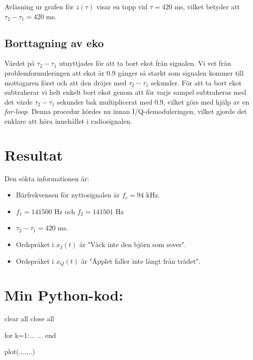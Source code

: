 \documentclass[10pt,twocolumn]{article}
\begin{document}
Avläsning ur grafen för $z(\tau)$ visar en topp vid $\tau = 420$ ms, vilket
betyder att $\tau_2 - \tau_1 = 420$ ms.

\subsection{Borttagning av eko}
Värdet på $\tau_2 - \tau_1$ utnyttjades för att ta bort ekot från signalen. Vi
vet från problemformuleringen att ekot är 0.9 gånger så starkt som signalen kommer
till mottagaren först och att den dröjer med $\tau_2 - \tau_1$ sekunder. För
att ta bort ekot subtraherar vi helt enkelt bort ekot genom att för varje
sampel subtraheras med det värde $\tau_2 - \tau_1$ sekunder bak multiplicerat
med 0.9, vilket görs med hjälp av en \textit{for-loop}. Denna procedur kördes
nu innan I/Q-demoduleringen, vilket gjorde det enklare att höra
innehållet i radiosignalen.

% 

\section{Resultat}

Den sökta informationen är:
\begin{itemize}
\item Bärfrekvensen för nyttosignalen är $f_c=94$ kHz.
\item $f_1=141500$ Hz och $f_2=141501$ Hz
\item $\tau_2 - \tau_1 = 420$ ms.
\item Ordspråket i $x_I(t)$ är "Väck inte den björn som sover".
\item Ordspråket i $x_Q(t)$ är "Äpplet faller inte långt från trädet".
\end{itemize}

\clearpage

\section*{Min Python-kod:}
\begin{spverbatim}
clear all
close all

for k=1:...
  ...
end

plot(...,...)
\end{spverbatim}
\end{document}
